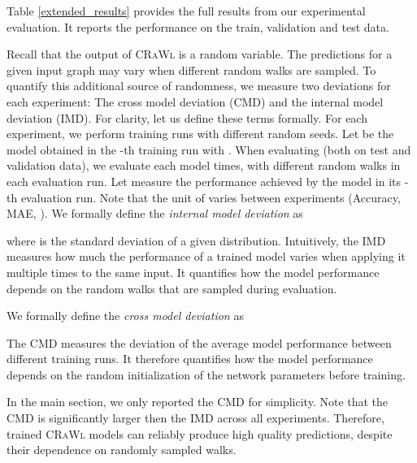 \documentclass{scrartcl} \usepackage[dvipsnames]{xcolor}
\newcommand{\crawl}{\textsc{CRaWl}}
\begin{document}
Table \ref{extended_results} provides the full results from our experimental evaluation.
It reports the performance on the train, validation and test data.


Recall that the output of \crawl{} is a random variable.
The predictions for a given input graph may vary when different random walks are sampled.
To quantify this additional source of randomness, we measure two deviations for each experiment: 
The cross model deviation (CMD) and the internal model deviation (IMD).
For clarity, let us define these terms formally.
For each experiment, we perform  training runs with different random seeds.
Let  be the model obtained in the -th training run with .
When evaluating (both on test and validation data), we evaluate each model  times, with different random walks in each evaluation run.
Let  measure the performance achieved by the model  in its -th evaluation run.
Note that the unit of  varies between experiments (Accuracy, MAE, ).
We formally define the \emph{internal model deviation} as

where  is the standard deviation of a given distribution.
Intuitively, the IMD measures how much the performance of a trained model varies when applying it multiple times to the same input.
It quantifies how the model performance depends on the random walks that are sampled during evaluation.

We formally define the \emph{cross model deviation} as

The CMD measures the deviation of the average model performance between different training runs.
It therefore quantifies how the model performance depends on the random initialization of the network parameters before training.

In the main section, we only reported the CMD for simplicity.
Note that the CMD is significantly larger then the IMD across all experiments.
Therefore, trained \crawl{} models can reliably produce high quality predictions, despite their dependence on randomly sampled walks.
\end{document}
